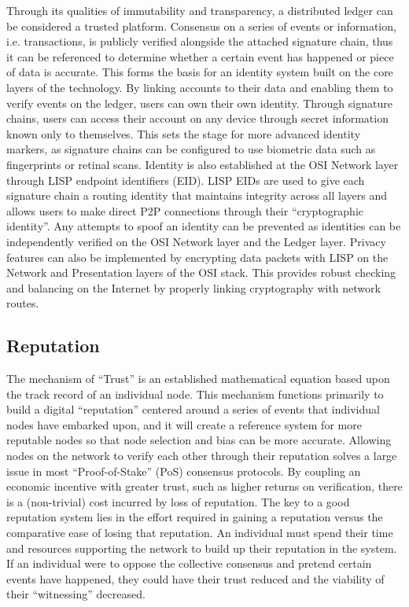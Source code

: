 \documentclass[11pt]{article}
\begin{document}
Through its qualities of immutability and transparency, a distributed ledger can be considered a trusted platform. Consensus on a series of events or information, i.e. transactions, is publicly verified alongside the attached signature chain, thus it can be referenced to determine whether a certain event has happened or piece of data is accurate.
This forms the basis for an identity system built on the core layers of the technology. By linking accounts to their data and enabling them to verify events on the ledger, users can own their own identity.
Through signature chains, users can access their account on any device through secret information known only to themselves. This sets the stage for more advanced identity markers, as signature chains can be configured to use biometric data such as fingerprints or retinal scans.
Identity is also established at the OSI Network layer through LISP endpoint identifiers (EID).
LISP EIDs are used to give each signature chain a routing identity that maintains integrity across all layers and allows users to make direct P2P connections through their ``cryptographic identity''.
Any attempts to spoof an identity can be prevented as identities can be independently verified on the OSI Network layer and the Ledger layer.
Privacy features can also be implemented by encrypting data packets with LISP on the Network and Presentation layers of the OSI stack.
This provides robust checking and balancing on the Internet by properly linking cryptography with network routes.

\subsection{Reputation}

The mechanism of ``Trust'' is an established mathematical equation based upon the track record of an individual node.
This mechanism functions primarily to build a digital ``reputation'' centered around a series of events that individual nodes have embarked upon, and it will create a reference system for more reputable nodes so that node selection and bias can be more accurate.
Allowing nodes on the network to verify each other through their reputation solves a large issue in most ``Proof-of-Stake'' (PoS) consensus protocols.
By coupling an economic incentive with greater trust, such as higher returns on verification, there is a (non-trivial) cost incurred by loss of reputation.
The key to a good reputation system lies in the effort required in gaining a reputation versus the comparative ease of losing that reputation.
An individual must spend their time and resources supporting the network to build up their reputation in the system.
If an individual were to oppose the collective consensus and pretend certain events have happened, they could have their trust reduced and the viability of their ``witnessing'' decreased.
\end{document}
